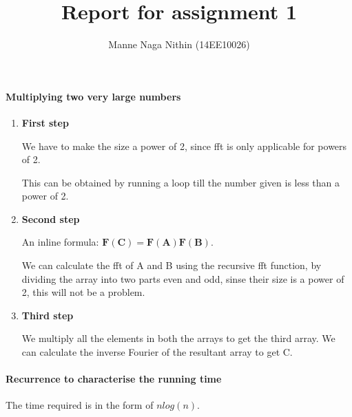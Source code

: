 \documentclass[a4paper,11pt]{article}
\title{Report for assignment 1}
\author{Manne Naga Nithin (14EE10026)}
\begin{document}
\maketitle

\paragraph{Multiplying two very large numbers}
\begin{enumerate}
 \item \textbf{First step}

We have to make the size a power of 2, since fft is only applicable for powers of 2.

This can be obtained by running a loop till the number given is less than a power of 2.

 \item \textbf{Second step}

An inline formula: $\mathbf{F(C)} = \mathbf{F(A)} \mathbf{F(B)}$.

We can calculate the fft of A and B using the recursive fft function, by dividing the array into two parts even and odd, sinse their size is a power of 2, this will not be a problem.

 \item \textbf{Third step}
 
 We multiply all the elements in both the arrays to get the third array.
 We can calculate the inverse Fourier of the resultant array to get C.

\end{enumerate}


\paragraph{Recurrence to characterise the running time}

The time required is in the form of
 $nlog(n)$.
\end{document}

